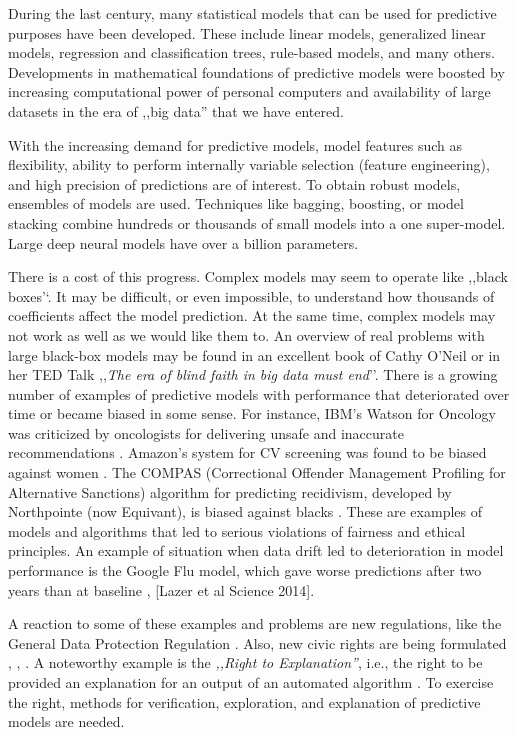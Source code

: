 \documentclass[12pt,]{krantz}
\theoremstyle{definition}
\theoremstyle{definition}
\theoremstyle{definition}
\theoremstyle{remark}
\begin{document}
During the last century, many statistical models that can be used for
predictive purposes have been developed. These include linear models,
generalized linear models, regression and classification trees,
rule-based models, and many others. Developments in mathematical
foundations of predictive models were boosted by increasing
computational power of personal computers and availability of large
datasets in the era of ,,big data'' that we have entered.

With the increasing demand for predictive models, model features such as
flexibility, ability to perform internally variable selection (feature
engineering), and high precision of predictions are of interest. To
obtain robust models, ensembles of models are used. Techniques like
bagging, boosting, or model stacking combine hundreds or thousands of
small models into a one super-model. Large deep neural models have over
a billion parameters.

There is a cost of this progress. Complex models may seem to operate
like ,,black boxes'`. It may be difficult, or even impossible, to
understand how thousands of coefficients affect the model prediction. At
the same time, complex models may not work as well as we would like them
to. An overview of real problems with large black-box models may be
found in an excellent book of Cathy O'Neil \citep{ONeil} or in her TED
Talk ,,\emph{The era of blind faith in big data must end}''. There is a
growing number of examples of predictive models with performance that
deteriorated over time or became biased in some sense. For instance,
IBM's Watson for Oncology was criticized by oncologists for delivering
unsafe and inaccurate recommendations \citep{IBMWatson}. Amazon's system
for CV screening was found to be biased against women \citep{AmazonAI}.
The COMPAS (Correctional Offender Management Profiling for Alternative
Sanctions) algorithm for predicting recidivism, developed by Northpointe
(now Equivant), is biased against blacks \citep{COMPAS}. These are
examples of models and algorithms that led to serious violations of
fairness and ethical principles. An example of situation when data drift
led to deterioration in model performance is the Google Flu model, which
gave worse predictions after two years than at baseline
\citep{GoogleFLU}, {[}Lazer et al Science 2014{]}.

A reaction to some of these examples and problems are new regulations,
like the General Data Protection Regulation \citep{EUGDPR}. Also, new
civic rights are being formulated \citep{RightToExpl},
\citep{RightToExpl2}, \citep{RightToExpl3}. A noteworthy example is the
\emph{,,Right to Explanation''}, i.e., the right to be provided an
explanation for an output of an automated algorithm \citep{RightToExpl}.
To exercise the right, methods for verification, exploration, and
explanation of predictive models are needed.
\end{document}
